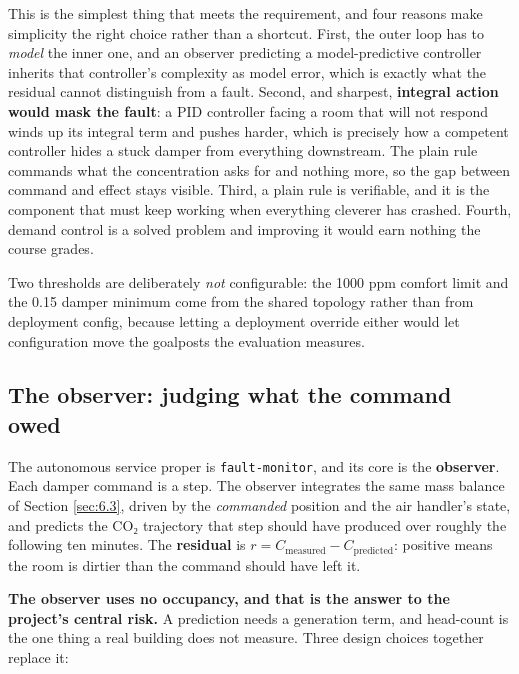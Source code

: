 This is the simplest thing that meets the requirement, and four reasons make simplicity the right
choice rather than a shortcut. First, the outer loop has to \emph{model} the inner one, and an
observer predicting a model-predictive controller inherits that controller's complexity as model
error, which is exactly what the residual cannot distinguish from a fault. Second, and sharpest,
\textbf{integral action would mask the fault}: a PID controller facing a room that will not respond
winds up its integral term and pushes harder, which is precisely how a competent controller hides a
stuck damper from everything downstream. The plain rule commands what the concentration asks for and
nothing more, so the gap between command and effect stays visible. Third, a plain rule is verifiable,
and it is the component that must keep working when everything cleverer has crashed. Fourth, demand
control is a solved problem and improving it would earn nothing the course grades.

Two thresholds are deliberately \emph{not} configurable: the 1000 ppm comfort limit and the 0.15
damper minimum come from the shared topology rather than from deployment config, because letting a
deployment override either would let configuration move the goalposts the evaluation measures.

\subsection{The observer: judging what the command owed}\label{sec:7.2}

The autonomous service proper is \texttt{fault-monitor}, and its core is the \textbf{observer}.
Each damper command is a step. The observer integrates the same mass balance of Section \ref{sec:6.3},
driven by the \emph{commanded} position and the air handler's state, and predicts the CO₂
trajectory that step should have produced over roughly the following ten minutes. The
\textbf{residual} is $r = C_\text{measured} - C_\text{predicted}$: positive means the room is
dirtier than the command should have left it.

\textbf{The observer uses no occupancy, and that is the answer to the project's central risk.} A
prediction needs a generation term, and head-count is the one thing a real building does not
measure. Three design choices together replace it:

